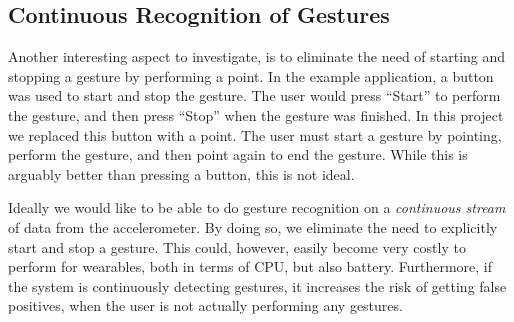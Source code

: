 \subsection{Continuous Recognition of Gestures}

Another interesting aspect to investigate, 
is to eliminate the need of starting and stopping a gesture by performing a point. 
In the \threedollar example application, 
a button was used to start and stop the gesture. 
The user would press ``Start'' to perform the gesture, 
and then press ``Stop'' when the gesture was finished. 
In this project we replaced this button with a point. 
The user must start a gesture by pointing, 
perform the gesture, 
and then point again to end the gesture. 
While this is arguably better than pressing a button, 
this is not ideal.

Ideally we would like to be able to do gesture recognition on a \emph{continuous stream} of data from the accelerometer. 
By doing so, we eliminate the need to explicitly start and stop a gesture.
This could, however, easily become very costly to perform for wearables,
both in terms of CPU, but also battery. Furthermore, if the system is continuously detecting gestures, it increases the risk of getting false positives, when the user is not actually performing any gestures.

